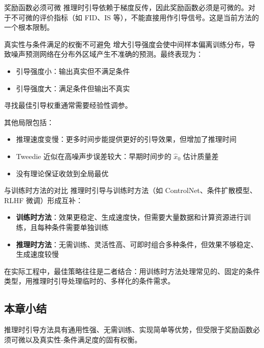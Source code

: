 \begin{warningbox}{奖励函数必须可微}
推理时引导依赖于梯度反传，因此奖励函数必须是可微的。对于不可微的评价指标（如 FID、IS 等），不能直接用作引导信号。这是当前方法的一个根本限制。
\end{warningbox}

\begin{warningbox}{真实性与条件满足的权衡不可避免}
增大引导强度会使中间样本偏离训练分布，导致噪声预测网络在分布外区域产生不准确的预测。最终表现为：
\begin{itemize}
    \item 引导强度小：输出真实但不满足条件
    \item 引导强度大：满足条件但输出不真实
\end{itemize}
寻找最佳引导权重通常需要经验性调参。
\end{warningbox}

其他局限包括：
\begin{itemize}
    \item 推理速度变慢：更多时间步能提供更好的引导效果，但增加了推理时间
    \item Tweedie 近似在高噪声步误差较大：早期时间步的 $\hat{x}_0$ 估计质量差
    \item 没有理论保证收敛到全局最优
\end{itemize}

\begin{knowledgebox}{与训练时方法的对比}
推理时引导与训练时方法（如 ControlNet、条件扩散模型、RLHF 微调）形成互补：
\begin{itemize}
    \item \textbf{训练时方法}：效果更稳定、生成速度快，但需要大量数据和计算资源进行训练，且每种条件需要单独训练
    \item \textbf{推理时方法}：无需训练、灵活性高、可即时组合多种条件，但效果不够稳定、生成速度较慢
\end{itemize}
在实际工程中，最佳策略往往是二者结合：用训练时方法处理常见的、固定的条件类型，用推理时引导处理临时的、多样化的条件需求。
\end{knowledgebox}

\subsection{本章小结}

推理时引导方法具有通用性强、无需训练、实现简单等优势，但受限于奖励函数必须可微以及真实性-条件满足度的固有权衡。

